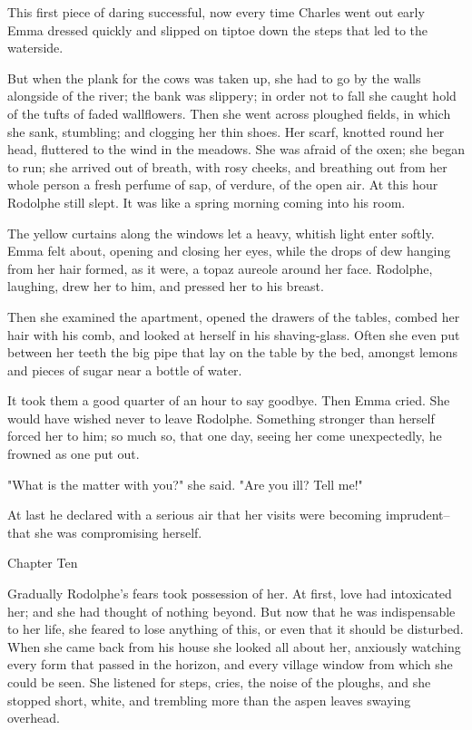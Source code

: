 \documentclass{tufte-book}
\begin{document}
This first piece of daring successful, now every time Charles went out
early Emma dressed quickly and slipped on tiptoe down the steps that led
to the waterside.

But when the plank for the cows was taken up, she had to go by the walls
alongside of the river; the bank was slippery; in order not to fall
she caught hold of the tufts of faded wallflowers. Then she went across
ploughed fields, in which she sank, stumbling; and clogging her thin
shoes. Her scarf, knotted round her head, fluttered to the wind in the
meadows. She was afraid of the oxen; she began to run; she arrived out
of breath, with rosy cheeks, and breathing out from her whole person a
fresh perfume of sap, of verdure, of the open air. At this hour Rodolphe
still slept. It was like a spring morning coming into his room.

The yellow curtains along the windows let a heavy, whitish light enter
softly. Emma felt about, opening and closing her eyes, while the drops
of dew hanging from her hair formed, as it were, a topaz aureole around
her face. Rodolphe, laughing, drew her to him, and pressed her to his
breast.

Then she examined the apartment, opened the drawers of the tables,
combed her hair with his comb, and looked at herself in his
shaving-glass. Often she even put between her teeth the big pipe that
lay on the table by the bed, amongst lemons and pieces of sugar near a
bottle of water.

It took them a good quarter of an hour to say goodbye. Then Emma cried.
She would have wished never to leave Rodolphe. Something stronger than
herself forced her to him; so much so, that one day, seeing her come
unexpectedly, he frowned as one put out.

"What is the matter with you?" she said. "Are you ill? Tell me!"

At last he declared with a serious air that her visits were becoming
imprudent--that she was compromising herself.



Chapter Ten

Gradually Rodolphe's fears took possession of her. At first, love had
intoxicated her; and she had thought of nothing beyond. But now that he
was indispensable to her life, she feared to lose anything of this, or
even that it should be disturbed. When she came back from his house she
looked all about her, anxiously watching every form that passed in the
horizon, and every village window from which she could be seen. She
listened for steps, cries, the noise of the ploughs, and she stopped
short, white, and trembling more than the aspen leaves swaying overhead.
\end{document}
